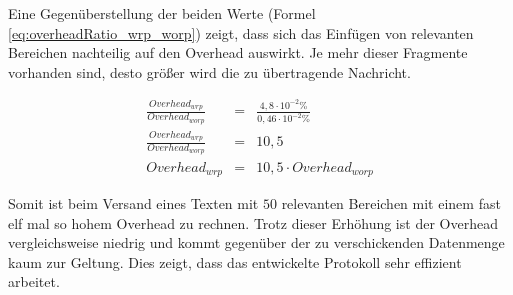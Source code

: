 Eine Gegenüberstellung der beiden Werte (Formel \ref{eq:overheadRatio_wrp_worp})
zeigt, dass sich das Einfügen von relevanten Bereichen nachteilig auf den
Overhead auswirkt. Je mehr dieser Fragmente vorhanden sind, desto größer wird
die zu übertragende Nachricht.

\begin{eqnarray} 
	\frac{ Overhead_{wrp} }{ Overhead_{worp} } & = & \frac{4,8 \cdot 10^{-2} \%}{0,46 \cdot 10^{-2} \%} \\
	\frac{ Overhead_{wrp} }{ Overhead_{worp} } & = & 10,5 \\ 
	Overhead_{wrp} & = & 10,5 \cdot Overhead_{worp}
	\label{eq:overheadRatio_wrp_worp}
\end{eqnarray}

Somit ist beim Versand eines Texten mit $50$ relevanten Bereichen mit einem fast
elf mal so hohem Overhead zu rechnen. Trotz dieser Erhöhung ist der Overhead
vergleichsweise niedrig und kommt gegenüber der zu verschickenden Datenmenge
kaum zur Geltung. Dies zeigt, dass das entwickelte Protokoll sehr effizient arbeitet.
